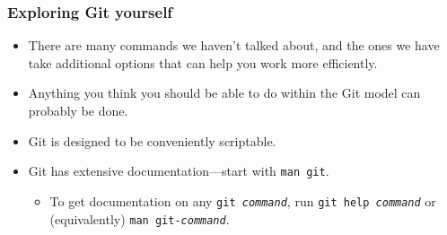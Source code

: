 \documentclass{beamer}
\begin{document}
\begin{frame}
  \frametitle{Exploring Git yourself}

  \begin{itemize}
  \item There are many commands we haven't talked about, and the ones
    we have take additional options that can help you work more
    efficiently.
  \item Anything you think you should be able to do within the Git
    model can probably be done.
  \item Git is designed to be conveniently scriptable.
  \item Git has extensive documentation---start with \texttt{man git}.
    \begin{itemize}
    \item To get documentation on any \texttt{git \textit{command}},
      run \texttt{git help \textit{command}} or (equivalently)
      \texttt{man git-\textit{command}}.
    \end{itemize}
  \end{itemize}
\end{frame}
\end{document}
